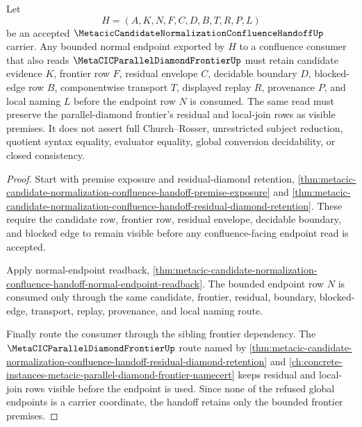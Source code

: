 \begin{theorem}
\label{thm:metacic-candidate-handoff-frontier-normal-endpoint-retention}
Let
$$
H=(A,K,N,F,C,D,B,T,R,P,L)
$$
be an accepted $\MetacicCandidateNormalizationConfluenceHandoffUp$ carrier. Any bounded normal endpoint exported by $H$ to a confluence consumer that also reads $\MetaCICParallelDiamondFrontierUp$ must retain candidate evidence $K$, frontier row $F$, residual envelope $C$, decidable boundary $D$, blocked-edge row $B$, componentwise transport $T$, displayed replay $R$, provenance $P$, and local naming $L$ before the endpoint row $N$ is consumed. The same read must preserve the parallel-diamond frontier's residual and local-join rows as visible premises. It does not assert full Church--Rosser, unrestricted subject reduction, quotient syntax equality, evaluator equality, global conversion decidability, or closed consistency.
\end{theorem}
\begin{proof}
Start with premise exposure and residual-diamond retention, \autoref{thm:metacic-candidate-normalization-confluence-handoff-premise-exposure} and \autoref{thm:metacic-candidate-normalization-confluence-handoff-residual-diamond-retention}. These require the candidate row, frontier row, residual envelope, decidable boundary, and blocked edge to remain visible before any confluence-facing endpoint read is accepted.

Apply normal-endpoint readback, \autoref{thm:metacic-candidate-normalization-confluence-handoff-normal-endpoint-readback}. The bounded endpoint row $N$ is consumed only through the same candidate, frontier, residual, boundary, blocked-edge, transport, replay, provenance, and local naming route.

Finally route the consumer through the sibling frontier dependency. The $\MetaCICParallelDiamondFrontierUp$ route named by \autoref{thm:metacic-candidate-normalization-confluence-handoff-residual-diamond-retention} and \autoref{ch:concrete-instances-metacic-parallel-diamond-frontier-namecert} keeps residual and local-join rows visible before the endpoint is used. Since none of the refused global endpoints is a carrier coordinate, the handoff retains only the bounded frontier premises.
\end{proof}

